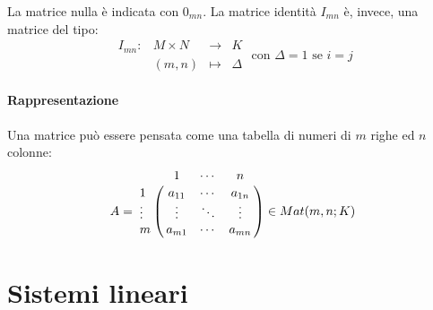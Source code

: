 \documentclass[a4paper,12pt,oneside]{article}
\begin{document}
La matrice nulla è indicata con $0_{mn}$. La matrice identità $I_{mn}$ è, invece,
una matrice del tipo:
\[
    \begin{array}{cccc}
        I_{mn}: & M \times N & \to & K \\
        & (m,n) & \mapsto & \Delta
    \end{array} \text{ con } \Delta{} = 1 \text{ se } i = j
\]

\paragraph{Rappresentazione} Una matrice può essere pensata come una tabella di
numeri di $m$ righe ed $n$ colonne:
\[
    A =
    \bordermatrix{~ & 1 & \cdots & n \cr
                  1 & a_{11} & \cdots & a_{1n} \cr
                  \vdots & \vdots & \ddots & \vdots \cr
                  m & a_{m1} & \cdots & a_{mn} \cr }
    \in Mat(m,n;K)
\]

\section{Sistemi lineari}
\end{document}

